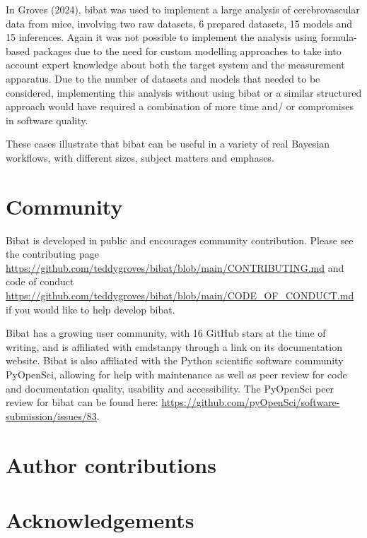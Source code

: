 \documentclass[
  letterpaper,
  DIV=11,
  numbers=noendperiod]{scrartcl}
\begin{document}
In Groves (2024), bibat was used to implement a large analysis of
cerebrovascular data from mice, involving two raw datasets, 6 prepared
datasets, 15 models and 15 inferences. Again it was not possible to
implement the analysis using formula-based packages due to the need for
custom modelling approaches to take into account expert knowledge about
both the target system and the measurement apparatus. Due to the number
of datasets and models that needed to be considered, implementing this
analysis without using bibat or a similar structured approach would have
required a combination of more time and/ or compromises in software
quality.

These cases illustrate that bibat can be useful in a variety of real
Bayesian workflows, with different sizes, subject matters and emphases.

\section{Community}\label{community}

Bibat is developed in public and encourages community contribution.
Please see the contributing page
\url{https://github.com/teddygroves/bibat/blob/main/CONTRIBUTING.md} and
code of conduct
\url{https://github.com/teddygroves/bibat/blob/main/CODE_OF_CONDUCT.md}
if you would like to help develop bibat.

Bibat has a growing user community, with 16 GitHub stars at the time of
writing, and is affiliated with cmdstanpy through a link on its
documentation website. Bibat is also affiliated with the Python
scientific software community PyOpenSci, allowing for help with
maintenance as well as peer review for code and documentation quality,
usability and accessibility. The PyOpenSci peer review for bibat can be
found here:
\url{https://github.com/pyOpenSci/software-submission/issues/83}.

\section{Author contributions}\label{author-contributions}

\section*{Acknowledgements}\label{acknowledgements}
\end{document}
